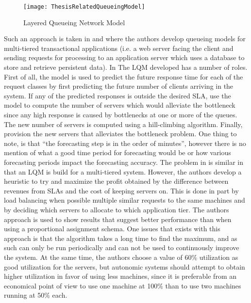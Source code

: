 \begin{figure}
	\centering
		\texttt{[image: ThesisRelatedQueueingModel]}
	\caption{Layered Queueing Network Model}
	\label{fig:queueingmodel}
\end{figure}

Such an approach is taken in \cite{related:model:lqm} and \cite{related:model:lqm2} where the authors develop queueing models for multi-tiered transactional applications (i.e. a web server facing the client and sending requests for processing to an application server which uses a database to store and retrieve persistent data). In \cite{related:model:lqm} The LQM developed has a number of roles. First of all, the model is used to predict the future response time for each of the request classes by first predicting the future number of clients arriving in the system. If any of the predicted responses is outside the desired SLA, use the model to compute the number of servers which would alleviate the bottleneck since any high response is caused by bottlenecks at one or more of the queues. The new number of servers is computed using a hill-climbing algorithm. Finally, provision the new servers that alleviates the bottleneck problem. One thing to note, is that ``the forecasting step is in the order of minutes'', however there is no mention of what a good time period for forecasting would be or how various forecasting periods impact the forecasting accuracy. The problem in \cite{related:model:lqm2} is similar in that an LQM is build for a multi-tiered system. However, the authors develop a heuristic to try and maximize the profit obtained by the difference between revenues from SLAs and the cost of keeping servers on. This is done in part by load balancing when possible multiple similar requests to the same machines and by deciding which servers to allocate to which application tier. The authors approach is used to show results that suggest better performance than when using a proportional assignment schema. One issues that exists with this approach is that the algorithm takes a long time to find the maximum, and as such can only be run periodically and can not be used to continuously improve the system. At the same time, the authors choose a value of 60\% utilization as good utilization for the servers, but autonomic systems should attempt to obtain higher utilization in favor of using less machines, since it is preferable from an economical point of view to use one machine at 100\% than to use two machines running at 50\% each.

